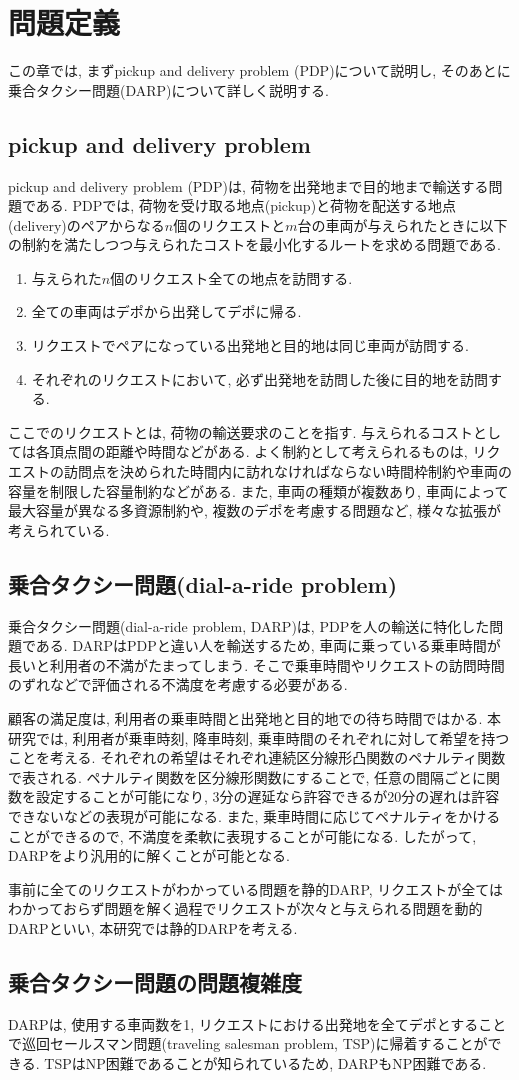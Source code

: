 \chapter{問題定義}\label{definition}
この章では, まずpickup and delivery problem (PDP)について説明し, そのあとに乗合タクシー問題(DARP)について詳しく説明する.
\section{pickup and delivery problem}
pickup and delivery problem (PDP)は, 荷物を出発地まで目的地まで輸送する問題である. PDPでは, 荷物を受け取る地点(pickup)と荷物を配送する地点(delivery)のペアからなる$n$個のリクエストと$m$台の車両が与えられたときに以下の制約を満たしつつ与えられたコストを最小化するルートを求める問題である.
\begin{enumerate}
 \item 与えられた$n$個のリクエスト全ての地点を訪問する.
 \item 全ての車両はデポから出発してデポに帰る.
 \item リクエストでペアになっている出発地と目的地は同じ車両が訪問する.
 \item それぞれのリクエストにおいて, 必ず出発地を訪問した後に目的地を訪問する.
\end{enumerate}
ここでのリクエストとは, 荷物の輸送要求のことを指す.
与えられるコストとしては各頂点間の距離や時間などがある. よく制約として考えられるものは, リクエストの訪問点を決められた時間内に訪れなければならない時間枠制約や車両の容量を制限した容量制約などがある. また, 車両の種類が複数あり, 車両によって最大容量が異なる多資源制約や, 複数のデポを考慮する問題など, 様々な拡張が考えられている.

\section{乗合タクシー問題(dial-a-ride problem)}
乗合タクシー問題(dial-a-ride problem, DARP)は, PDPを人の輸送に特化した問題である. DARPはPDPと違い人を輸送するため, 車両に乗っている乗車時間が長いと利用者の不満がたまってしまう. そこで乗車時間やリクエストの訪問時間のずれなどで評価される不満度を考慮する必要がある.

顧客の満足度は, 利用者の乗車時間と出発地と目的地での待ち時間ではかる. 本研究では, 利用者が乗車時刻, 降車時刻, 乗車時間のそれぞれに対して希望を持つことを考える. それぞれの希望はそれぞれ連続区分線形凸関数のペナルティ関数で表される. ペナルティ関数を区分線形関数にすることで, 任意の間隔ごとに関数を設定することが可能になり, 3分の遅延なら許容できるが20分の遅れは許容できないなどの表現が可能になる. また, 乗車時間に応じてペナルティをかけることができるので, 不満度を柔軟に表現することが可能になる. したがって, DARPをより汎用的に解くことが可能となる.

事前に全てのリクエストがわかっている問題を静的DARP, リクエストが全てはわかっておらず問題を解く過程でリクエストが次々と与えられる問題を動的DARPといい, 本研究では静的DARPを考える.

\section{乗合タクシー問題の問題複雑度}
DARPは, 使用する車両数を1, リクエストにおける出発地を全てデポとすることで巡回セールスマン問題(traveling salesman problem, TSP)に帰着することができる. TSPはNP困難\cite{TSP}であることが知られているため, DARPもNP困難である.
